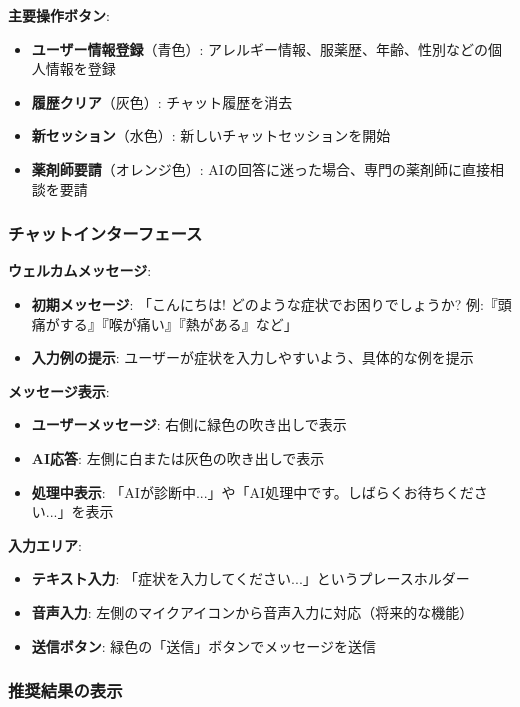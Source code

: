 \documentclass[a4paper,11pt,ja=standard,xelatex]{bxjsarticle}
\theoremstyle{definition}
\begin{document}
\textbf{主要操作ボタン}:
\begin{itemize}
\item \textbf{ユーザー情報登録}（青色）: アレルギー情報、服薬歴、年齢、性別などの個人情報を登録
\item \textbf{履歴クリア}（灰色）: チャット履歴を消去
\item \textbf{新セッション}（水色）: 新しいチャットセッションを開始
\item \textbf{薬剤師要請}（オレンジ色）: AIの回答に迷った場合、専門の薬剤師に直接相談を要請
\end{itemize}

\subsubsection{チャットインターフェース}

\textbf{ウェルカムメッセージ}:
\begin{itemize}
\item \textbf{初期メッセージ}: 「こんにちは! どのような症状でお困りでしょうか? 例:『頭痛がする』『喉が痛い』『熱がある』など」
\item \textbf{入力例の提示}: ユーザーが症状を入力しやすいよう、具体的な例を提示
\end{itemize}

\textbf{メッセージ表示}:
\begin{itemize}
\item \textbf{ユーザーメッセージ}: 右側に緑色の吹き出しで表示
\item \textbf{AI応答}: 左側に白または灰色の吹き出しで表示
\item \textbf{処理中表示}: 「AIが診断中...」や「AI処理中です。しばらくお待ちください...」を表示
\end{itemize}

\textbf{入力エリア}:
\begin{itemize}
\item \textbf{テキスト入力}: 「症状を入力してください...」というプレースホルダー
\item \textbf{音声入力}: 左側のマイクアイコンから音声入力に対応（将来的な機能）
\item \textbf{送信ボタン}: 緑色の「送信」ボタンでメッセージを送信
\end{itemize}

\subsubsection{推奨結果の表示}
\end{document}
